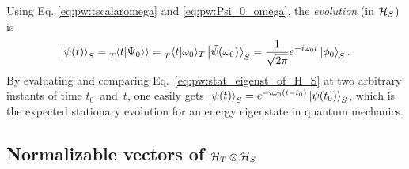 


Using Eq. \eqref{eq:pw:tscalaromega} and \eqref{eq:pw:Psi_0_omega}, the \emph{evolution} (in $\mathcal{H}_S$) is
\begin{equation}
  \ket{\psi(t)}_S = \prescript{}{T}{\!\left.\left\langle t \middle| \Psi_0 \right\rangle\right\rangle} = \prescript{}{T}{\braket{t}{\omega_0}}_{T} \ket{\tilde{\psi}(\omega_0)}_S =
    \frac{1}{\sqrt{2\pi}} e^{-i\omega_0 t} \ket{\phi_0}_S \text{.}
\label{eq:pw:stat_eigenst_of_H_S}
\end{equation}
By evaluating and comparing Eq.~\eqref{eq:pw:stat_eigenst_of_H_S} at two arbitrary instants of time
$t_0$~and~$t$,
one easily gets
$\ket{\psi(t)}_{S} = e^{-i\omega_{0}(t-t_{0})} \ket{\psi(t_0)}_{S}$,
which is the expected stationary evolution for an energy eigenstate in quantum mechanics.

\subsection{Normalizable vectors of $\mathcal{H}_T \otimes \mathcal{H}_S$}
\label{sec:properpw}

